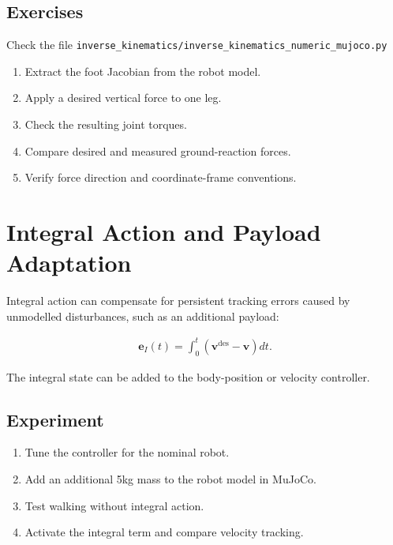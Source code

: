 \documentclass[11pt,a4paper]{article}
\begin{document}
\subsection*{Exercises}

Check the file \verb|inverse_kinematics/inverse_kinematics_numeric_mujoco.py|

\begin{enumerate}[label=\arabic*.]
    \item Extract the foot Jacobian from the robot model.
    \item Apply a desired vertical force to one leg.
    \item Check the resulting joint torques.
    \item Compare desired and measured ground-reaction forces.
    \item Verify force direction and coordinate-frame conventions.
\end{enumerate}


\section{Integral Action and Payload Adaptation}

Integral action can compensate for persistent tracking errors caused by unmodelled disturbances, such as an additional payload:

\begin{align*}
\bm{e}_I(t)
=
\int_{0}^{t}
\left(
\bm{v}^{\mathrm{des}}-\bm{v}
\right)
dt.
\end{align*}

The integral state can be added to the body-position or velocity controller.

\subsection*{Experiment}

\begin{enumerate}[label=\arabic*.]
    \item Tune the controller for the nominal robot.
    \item Add an additional 5kg mass to the robot model in MuJoCo.
    \item Test walking without integral action.
    \item Activate the integral term and compare velocity tracking.
\end{enumerate}
\end{document}
